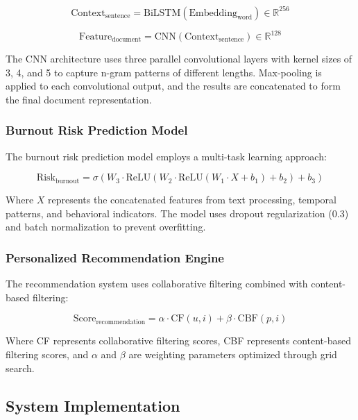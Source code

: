 \documentclass[conference,10pt]{IEEEtran}
\begin{document}
\begin{equation}
\text{Context}_{\text{sentence}} = \text{BiLSTM}(\text{Embedding}_{\text{word}}) \in \mathbb{R}^{256}
\end{equation}

\begin{equation}
\text{Feature}_{\text{document}} = \text{CNN}(\text{Context}_{\text{sentence}}) \in \mathbb{R}^{128}
\end{equation}

The CNN architecture uses three parallel convolutional layers with kernel sizes of 3, 4, and 5 to capture n-gram patterns of different lengths. Max-pooling is applied to each convolutional output, and the results are concatenated to form the final document representation.

\subsubsection{Burnout Risk Prediction Model}

The burnout risk prediction model employs a multi-task learning approach:

\begin{equation}
\text{Risk}_{\text{burnout}} = \sigma(W_3 \cdot \text{ReLU}(W_2 \cdot \text{ReLU}(W_1 \cdot X + b_1) + b_2) + b_3)
\end{equation}

Where $X$ represents the concatenated features from text processing, temporal patterns, and behavioral indicators. The model uses dropout regularization (0.3) and batch normalization to prevent overfitting.

\subsubsection{Personalized Recommendation Engine}

The recommendation system uses collaborative filtering combined with content-based filtering:

\begin{equation}
\text{Score}_{\text{recommendation}} = \alpha \cdot \text{CF}(u, i) + \beta \cdot \text{CBF}(p, i)
\end{equation}

Where CF represents collaborative filtering scores, CBF represents content-based filtering scores, and $\alpha$ and $\beta$ are weighting parameters optimized through grid search.

\subsection{System Implementation}
\end{document}
